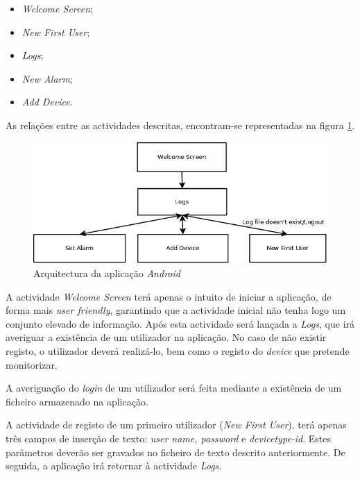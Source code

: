 \documentclass[a4paper]{article}
\begin{document}
\begin{itemize}
\item \textit{Welcome Screen};
\item \textit{New First User};
\item \textit{Logs};
\item \textit{New Alarm};
\item \textit{Add Device}.
\end{itemize}

\vspace{35mm}

As relações entre as actividades descritas, encontram-se representadas na figura \ref{fig:app_android_geral}.

\vspace{5mm}

\begin{figure}[hb]
  \centering
  \includegraphics[scale=0.40]{App_geral.png}
  \caption{Arquitectura da aplicação \textit{Android}}
  \label{fig:app_android_geral}
\end{figure}

A actividade \textit{Welcome Screen} terá apenas o intuito de iniciar a aplicação, de forma mais \textit{user friendly}, garantindo que a actividade inicial não tenha logo um conjunto elevado de informação. Após esta actividade será lançada a \textit{Logs}, que irá averiguar a existência de um utilizador na aplicação. No caso de não existir registo, o utilizador deverá realizá-lo, bem como o registo do \textit{device} que pretende monitorizar.

A averiguação do \textit{login} de um utilizador será feita mediante a existência de um ficheiro armazenado na aplicação.

A actividade de registo de um primeiro utilizador (\textit{New First User}), terá apenas três campos de inserção de texto: \textit{user name, password} e \textit{devicetype-id}. Estes parâmetros deverão ser gravados no ficheiro de texto descrito anteriormente. De seguida, a aplicação irá retornar à actividade \textit{Logs}.
\end{document}
